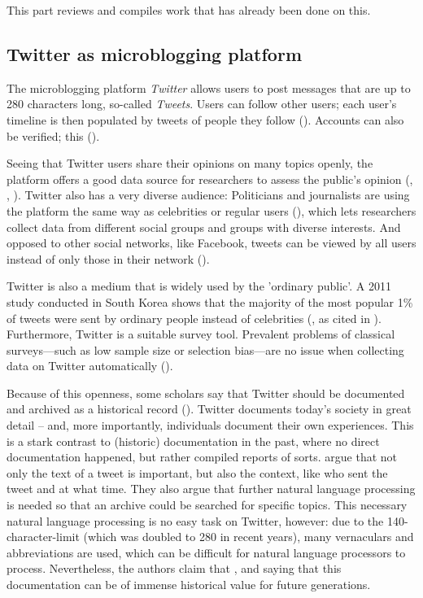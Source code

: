 This part reviews and compiles work that has already been done on this.

\subsection{Twitter as microblogging platform}
The microblogging platform \emph{Twitter} allows users to post messages that are up to 280 characters long, so-called \emph{Tweets}. Users can follow other users; each user's timeline is then populated by tweets of people they follow (\cite{thimm2012}). Accounts can also be verified; this  (\cite{twitterinc.}). 

Seeing that Twitter users share their opinions on many topics openly, the platform offers a good data source for researchers to assess the public's opinion (\cite{pak2010twitter}, \cite{pfaffenberger2016twitter}, \cite{broniatowski2014twitter}). Twitter also has a very diverse audience: Politicians and journalists are using the platform the same way as celebrities or regular users (\cite{pak2010twitter}), which lets researchers collect data from different social groups and groups with diverse interests. And opposed to other social networks, like Facebook, tweets can be viewed by all users instead of only those in their network (\cite{park2013}).

Twitter is also a medium that is widely used by the 'ordinary public'. A 2011 study conducted in South Korea shows that the majority of the most popular 1\% of tweets were sent by ordinary people instead of celebrities (\cite{chang2011structure}, as cited in \cite{park2013}). Furthermore, Twitter is a suitable survey tool. Prevalent problems of classical surveys---such as low sample size or selection bias---are no issue when collecting data on Twitter automatically (\cite{takabe2016}). 

Because of this openness, some scholars say that Twitter should be documented and archived as a historical record (\cite{risse2014documenting}). Twitter documents today's society in great detail -- and, more importantly, individuals document their own experiences. This is a stark contrast to (historic) documentation in the past, where no direct documentation happened, but rather compiled reports of sorts. \citeauthor{risse2014documenting} argue that not only the text of a tweet is important, but also the context, like who sent the tweet and at what time. They also argue that further natural language processing is needed so that an archive could be searched for specific topics. This necessary natural language processing is no easy task on Twitter, however: due to the 140-character-limit (which was doubled to 280 in recent years), many vernaculars and abbreviations are used, which can be difficult for natural language processors to process. Nevertheless, the authors claim that  \parencite[9]{risse2014documenting}, and saying that this documentation can be of immense historical value for future generations.

